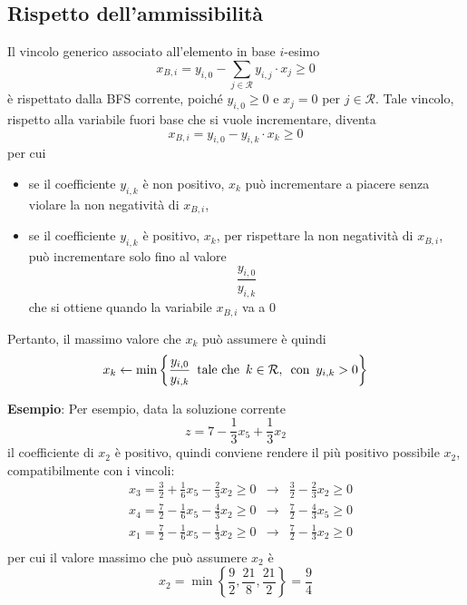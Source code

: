 \documentclass[a4paper]{extarticle}
\begin{document}
\subsection{Rispetto dell'ammissibilità}
Il vincolo generico associato all'elemento in base $i$-esimo
\[x_{B,i} = y_{i,0} - \sum_{j \in \mathcal{R}} y_{i,j} \cdot x_j \geq 0\]
è rispettato dalla BFS corrente, poiché $y_{i,0} \geq 0$ e $x_j = 0$ per $j \in \mathcal{R}$. Tale vincolo, rispetto alla variabile fuori base che si vuole incrementare, diventa
\[x_{B,i} = y_{i,0} - y_{i,k} \cdot x_k \geq 0\]
per cui
\begin{itemize}
    \item se il coefficiente $y_{i,k}$ è non positivo, $x_k$ può incrementare a piacere senza violare la non negatività di $x_{B,i}$,
    \item se il coefficiente $y_{i,k}$ è positivo, $x_k$, per rispettare la non negatività di $x_{B,i}$, può incrementare solo fino al valore
    \[\frac{y_{i,0}}{y_{i,k}}\]
    che si ottiene quando la variabile $x_{B,i}$ va a $0$
\end{itemize}
Pertanto, il massimo valore che $x_k$ può assumere è quindi
\[x_k \leftarrow \min \left\{\frac{y_{i,0}}{y_{i,k}} \hspace{0.5em} \text{tale che} \hspace{0.5em} k \in \mathcal{R}, \hspace{0.5em} \text{con} \hspace{0.5em} y_{i,k} > 0\right\}\]

\vspace{1em}
\noindent
\textbf{Esempio}: Per esempio, data la soluzione corrente
\[z=7 - \frac{1}{3}x_5+\frac{1}{3}x_2\]
il coefficiente di $x_2$ è positivo, quindi conviene rendere il più positivo possibile $x_2$, compatibilmente con i vincoli:
\begin{align*}
    &x_3=\frac{3}{2}+\frac{1}{6}x_5-\frac{2}{3}x_2 \geq 0 & \rightarrow & \frac{3}{2}-\frac{2}{3}x_2 \geq 0\\
    &x_4=\frac{7}{2}-\frac{1}{6}x_5-\frac{4}{3}x_2 \geq 0 & \rightarrow & \frac{7}{2}-\frac{4}{3}x_5 \geq 0\\
    &x_1=\frac{7}{2}-\frac{1}{6}x_5-\frac{1}{3}x_2 \geq 0 & \rightarrow & \frac{7}{2}-\frac{1}{3}x_2 \geq 0\\
\end{align*}
per cui il valore massimo che può assumere $x_2$ è
\[x_2 = \min \left\{\frac{9}{2},\frac{21}{8},\frac{21}{2}\right\} = \frac{9}{4}\]

\vspace{1em}
\noindent
\end{document}
